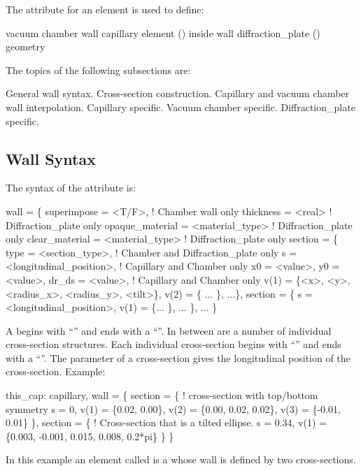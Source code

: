 The  attribute for an element is used to define:
\begin{example}
  vacuum chamber wall
  capillary element () inside wall
  diffraction_plate () geometry
\end{example}

The topics of the following subsections are:
\begin{example}
        General wall syntax.
        Cross-section construction. 
        Capillary and vacuum chamber wall interpolation.
        Capillary specific.
        Vacuum chamber specific.
        Diffraction_plate specific.
\end{example}

\subsection{Wall Syntax}
\label{s:wall.syntax}

The syntax of the  attribute is:
\begin{example}
  wall = \{
    superimpose = <T/F>,                     ! Chamber wall only
    thickness = <real>                       ! Diffraction_plate only
    opaque_material = <material_type>        ! Diffraction_plate only
    clear_material = <material_type>         ! Diffraction_plate only
    section = \{ 
      type = <section_type>,                 ! Chamber and Diffraction_plate only
      s = <longitudinal_position>,           ! Capillary and Chamber only
      x0 = <value>,
      y0 = <value>,
      dr_ds = <value>,                       ! Capillary and Chamber only
      v(1) = \{<x>, <y>, <radius_x>, <radius_y>, <tilt>\}, 
      v(2) = \{ ... \},
      ...\},
    section = \{
      s = <longitudinal_position>, 
      v(1) = \{... \},
      ... \},
    ... \}
\end{example}
A  begins with ``'' and ends with a
``\vn{\}}''. In between are a number of individual cross-section
structures. Each individual cross-section begins with ``'' and ends with a ``\vn{\}}''. The  parameter of a
cross-section gives the longitudinal position of the cross-section.
Example:
\begin{example}
  this_cap: capillary, 
    wall = \{   
      section = \{ ! cross-section with top/bottom symmetry
        s = 0, v(1) =  \{0.02, 0.00\}, 
        v(2) = \{0.00, 0.02, 0.02\}, v(3) = \{-0.01, 0.01\} \}, 
      section = \{  ! Cross-section that is a tilted ellipse.
        s = 0.34, 
        v(1) = \{0.003, -0.001, 0.015, 0.008, 0.2*pi\} \} \}
\end{example}
In this example an element called  is a 
whose wall is defined by two cross-sections.

